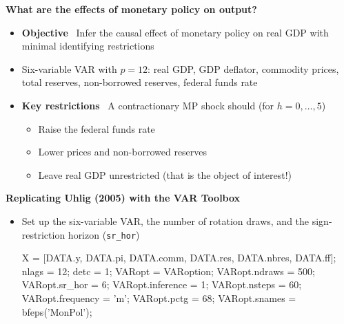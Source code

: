 \documentclass[10pt,handout]{beamer}
\begin{document}

\begin{frame}
{\textbf{What are the effects of monetary policy on output?}}
\begin{itemize}
\item \textbf{Objective} \ Infer the causal effect of monetary policy on real GDP with minimal identifying restrictions\bigskip\pause
\item Six-variable VAR with $p=12$: real GDP, GDP deflator, commodity prices, total reserves, non-borrowed reserves, federal funds rate\bigskip
\item \textbf{Key restrictions} \ A contractionary MP shock should (for $h = 0, \ldots, 5$)\smallskip
\begin{itemize}
\item Raise the federal funds rate\medskip
\item Lower prices and non-borrowed reserves\medskip
\item Leave real GDP unrestricted (that is the object of interest!)
\end{itemize}
\end{itemize}
\end{frame}


\begin{frame}[fragile]
{\textbf{Replicating Uhlig (2005) with the VAR Toolbox}}
\begin{itemize}
\item Set up the six-variable VAR, the number of rotation draws, and the sign-restriction horizon (\texttt{sr\_hor})
\par\smallskip
\begin{matlabcode}
X = [DATA.y, DATA.pi, DATA.comm, DATA.res, DATA.nbres, DATA.ff];
nlags = 12;  detc = 1;
VARopt = VARoption;
VARopt.ndraws    = 500;
VARopt.sr_hor    = 6;
VARopt.inference = 1;
VARopt.nsteps    = 60;
VARopt.frequency = 'm';
VARopt.pctg      = 68;
VARopt.snames    = {bfeps('MonPol')};
\end{matlabcode}
\end{itemize}
\end{frame}

\end{document}
